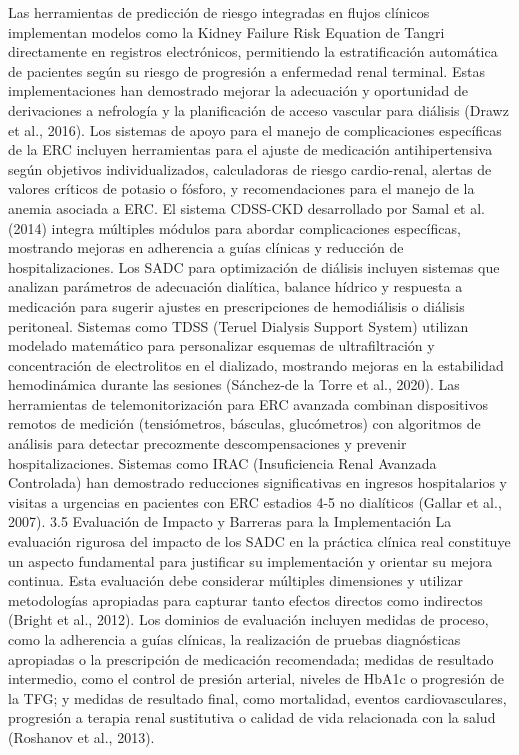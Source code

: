 \documentclass{article}
\begin{document}
\begin{multicols}{2}
Las herramientas de predicción de riesgo integradas en flujos clínicos implementan modelos como la Kidney Failure Risk Equation de Tangri directamente en registros electrónicos, permitiendo la estratificación automática de pacientes según su riesgo de progresión a enfermedad renal terminal. Estas implementaciones han demostrado mejorar la adecuación y oportunidad de derivaciones a nefrología y la planificación de acceso vascular para diálisis (Drawz et al., 2016).
Los sistemas de apoyo para el manejo de complicaciones específicas de la ERC incluyen herramientas para el ajuste de medicación antihipertensiva según objetivos individualizados, calculadoras de riesgo cardio-renal, alertas de valores críticos de potasio o fósforo, y recomendaciones para el manejo de la anemia asociada a ERC. El sistema CDSS-CKD desarrollado por Samal et al. (2014) integra múltiples módulos para abordar complicaciones específicas, mostrando mejoras en adherencia a guías clínicas y reducción de hospitalizaciones.
Los SADC para optimización de diálisis incluyen sistemas que analizan parámetros de adecuación dialítica, balance hídrico y respuesta a medicación para sugerir ajustes en prescripciones de hemodiálisis o diálisis peritoneal. Sistemas como TDSS (Teruel Dialysis Support System) utilizan modelado matemático para personalizar esquemas de ultrafiltración y concentración de electrolitos en el dializado, mostrando mejoras en la estabilidad hemodinámica durante las sesiones (Sánchez-de la Torre et al., 2020).
Las herramientas de telemonitorización para ERC avanzada combinan dispositivos remotos de medición (tensiómetros, básculas, glucómetros) con algoritmos de análisis para detectar precozmente descompensaciones y prevenir hospitalizaciones. Sistemas como IRAC (Insuficiencia Renal Avanzada Controlada) han demostrado reducciones significativas en ingresos hospitalarios y visitas a urgencias en pacientes con ERC estadios 4-5 no dialíticos (Gallar et al., 2007).
 3.5 Evaluación de Impacto y Barreras para la Implementación
La evaluación rigurosa del impacto de los SADC en la práctica clínica real constituye un aspecto fundamental para justificar su implementación y orientar su mejora continua. Esta evaluación debe considerar múltiples dimensiones y utilizar metodologías apropiadas para capturar tanto efectos directos como indirectos (Bright et al., 2012).
Los dominios de evaluación incluyen medidas de proceso, como la adherencia a guías clínicas, la realización de pruebas diagnósticas apropiadas o la prescripción de medicación recomendada; medidas de resultado intermedio, como el control de presión arterial, niveles de HbA1c o progresión de la TFG; y medidas de resultado final, como mortalidad, eventos cardiovasculares, progresión a terapia renal sustitutiva o calidad de vida relacionada con la salud (Roshanov et al., 2013).

\end{multicols}
\end{document}

